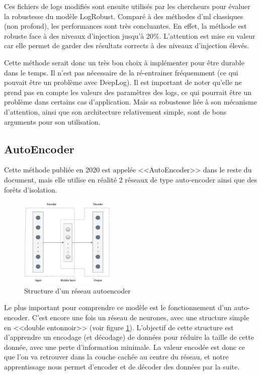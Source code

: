 \documentclass[openany, 11pt]{memoir}
\begin{document}
Ces fichiers de \glspl{log} modifiés sont ensuite utilisés par les chercheurs pour évaluer la robustesse du modèle LogRobust. Comparé à des méthodes d'\gls{ml} classiques (non profond), les performances sont très concluantes. En effet, la méthode est robuste face à des niveaux d'injection jusqu'à 20\%. L'attention est mise en valeur car elle permet de garder des résultats corrects à des niveaux d'injection élevés.

\bigskip
Cette méthode serait donc un très bon choix à implémenter pour être durable dans le temps. Il n'est pas nécessaire de la ré-entrainer fréquemment (ce qui pouvait être un problème avec DeepLog). Il est important de noter qu'elle ne prend pas en compte les valeurs des paramètres des \glspl{log}, ce qui pourrait être un problème dans certains cas d'application. Mais sa robustesse liée à son mécanisme d'attention, ainsi que son architecture relativement simple, sont de bons arguments pour son utilisation.

\subsection{AutoEncoder}

Cette méthode publiée en 2020 \cite{autoencoder} est appelée <<AutoEncoder>> dans le reste du document, mais elle utilise en réalité 2 réseaux de type auto-encoder ainsi que des forêts d'isolation.

\begin{figure}[ht]
	\centering
	\includegraphics[width=0.4\textwidth]{images/autoencoder.png}
	\caption{Structure d'un réseau autoencoder}
	\label{autoencoder}
\end{figure}

\bigskip
Le plus important pour comprendre ce modèle est le fonctionnement d'un auto-encoder. C'est encore une fois un réseau de neurones, avec une structure simple en <<double entonnoir>> (voir figure \ref{autoencoder}). L'objectif de cette structure est d'apprendre un encodage (et décodage) de données pour réduire la taille de cette donnée, avec une perte d'information minimale. La valeur encodée est donc ce que l'on va retrouver dans la couche cachée au centre du réseau, et notre apprentissage nous permet d'encoder et de décoder des données par la suite.
\end{document}
